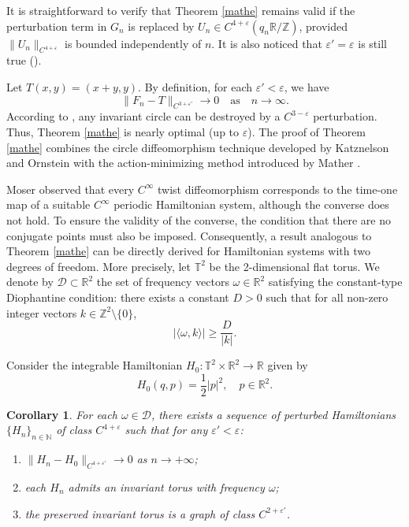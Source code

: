 \documentclass{amsart}
\newcounter{item}[section]
\newtheorem{Corollary}[Definition]{Corollary}
\theoremstyle{definition}
\begin{document}
It is straightforward to verify that Theorem \ref{mathe} remains valid if the perturbation term in \( G_n \) is replaced by \( U_n \in C^{4+\varepsilon}(q_n \mathbb{R}/\mathbb{Z}) \), provided \( \|U_n\|_{C^{4+\varepsilon}} \) is bounded independently of \( n \). It is also noticed that  $\varepsilon'=\varepsilon$ is still true (\cite{H1}).

Let \( T(x, y) = (x + y, y) \). By definition, for each \( \varepsilon' < \varepsilon \), we have
\[
\|F_n - T\|_{C^{3+\varepsilon'}} \to 0 \quad \text{as} \quad n \to \infty.
\]
According to \cite{H1}, any invariant circle can be destroyed by a \( C^{3-\varepsilon} \) perturbation. Thus, Theorem \ref{mathe} is nearly optimal (up to \( \varepsilon \)).
The proof of Theorem \ref{mathe} combines the circle diffeomorphism technique developed by Katznelson and Ornstein \cite{KO1} with the action-minimizing method introduced by Mather \cite{FoM}.

Moser \cite{Mo4} observed that every $C^\infty$ twist diffeomorphism corresponds to the time-one map of a suitable $C^\infty$ periodic Hamiltonian system, although the converse does not hold. To ensure the validity of the converse, the condition that there are no conjugate points must also be imposed. Consequently, a result analogous to Theorem \ref{mathe} can be directly derived for Hamiltonian systems with two degrees of freedom. More precisely, let $\mathbb{T}^2$ be the 2-dimensional flat torus. We denote by $\mathcal{D} \subset \mathbb{R}^2$ the set of frequency vectors $\omega \in \mathbb{R}^2$ satisfying the constant-type Diophantine condition: there exists a constant $D > 0$ such that for all non-zero integer vectors $k \in \mathbb{Z}^2 \setminus \{0\}$,
\begin{equation}\label{eq:diophantine}
	|\langle \omega, k \rangle| \geq \frac{D}{|k|}.
\end{equation}

Consider the integrable Hamiltonian $H_0: \mathbb{T}^2 \times \mathbb{R}^2 \to \mathbb{R}$ given by
\[
H_0(q, p) = \frac{1}{2} |p|^2, \quad p \in \mathbb{R}^2.
\]
\begin{Corollary}\label{macor1}
	For each $\omega \in \mathcal{D}$, there exists a sequence of perturbed Hamiltonians $\{H_n\}_{n\in\mathbb{N}}$ of class $C^{4+\varepsilon}$  such that for any $\varepsilon' < \varepsilon$:
	\begin{enumerate}
		\item $\|H_n - H_0\|_{C^{4+\varepsilon'}} \to 0$ as $n \to +\infty$;
		\item each $H_n$ admits an invariant torus with frequency $\omega$;
		\item the preserved invariant torus is a graph of class $C^{2+\varepsilon'}$.
	\end{enumerate}
\end{Corollary}
\end{document}
